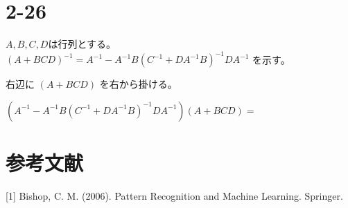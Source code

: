 \documentclass{ltjsarticle}
\begin{document}
\section*{2-26}
$A,B,C,D$は行列とする。\\
$
(A + BCD)^{-1} 
=  A^{-1} -  A^{-1}B (C^{-1} + D A^{-1} B)^{-1} D A^{-1}
$
を示す。

右辺に
$
(A + BCD)
$
を右から掛ける。

$
(A^{-1} -  A^{-1}B (C^{-1} + D A^{-1} B)^{-1} D A^{-1}) (A + BCD)
= 
$












\section*{参考文献}
[1] Bishop, C. M. (2006). Pattern Recognition and Machine Learning. Springer.
\end{document}
